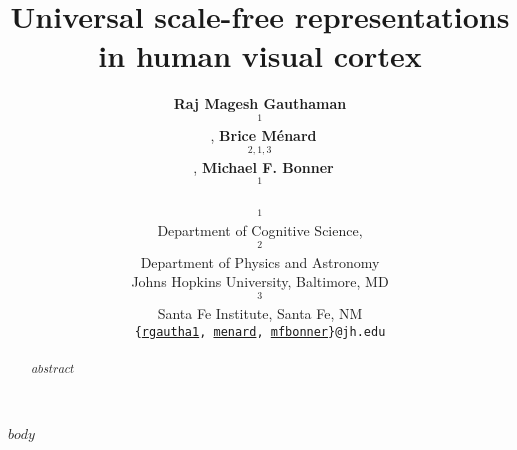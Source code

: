 \documentclass[10pt]{article}
\title{Universal scale-free representations\\in human visual cortex}
\author{
    \textbf{Raj Magesh Gauthaman$$^1$$}~\orcidlink{0000-0001-7121-1532},
    \textbf{Brice Ménard$$^{2,1,3}$$}~\orcidlink{0000-0003-3164-6974},
    \textbf{Michael F. Bonner$$^1$$}~\orcidlink{0000-0002-4992-674X}\\
    $$^1$$Department of Cognitive Science,
    $$^2$$Department of Physics and Astronomy\\
    Johns Hopkins University, Baltimore, MD\\
    $$^3$$Santa Fe Institute, Santa Fe, NM\\
    \texttt{\{\href{mailto:rgautha1@jh.edu}{rgautha1}, \href{mailto:menard@jh.edu}{menard}, \href{mailto:mfbonner@jh.edu}{mfbonner}\}@jh.edu}
}
\date{}
\begin{document}
\maketitle

\begin{abstract}
    $abstract$
\end{abstract}

$body$

\newpage
\printbibliography
\end{document}

